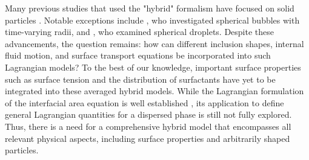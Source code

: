 Many previous studies that used the "hybrid" formalism have focused on solid particles \citep{buyevich1979flow,jackson1997locally}. 
Notable exceptions include \citet{zhang1994ensemble}, who investigated spherical bubbles with time-varying radii, and \citet{zhang1997momentum}, who examined spherical droplets. 
Despite these advancements, the question remains: how can different inclusion shapes, internal fluid motion, and surface transport equations be incorporated into such Lagrangian models? 
To the best of our knowledge, important surface properties such as surface tension and the distribution of surfactants have yet to be integrated into these averaged hybrid models. 
While the Lagrangian formulation of the interfacial area equation is well established \citep{lhuillier2000bilan}, its application to define general Lagrangian quantities for a dispersed phase is still not fully explored. 
Thus, there is a need for a comprehensive hybrid model that encompasses all relevant physical aspects, including surface properties and arbitrarily shaped particles.%







